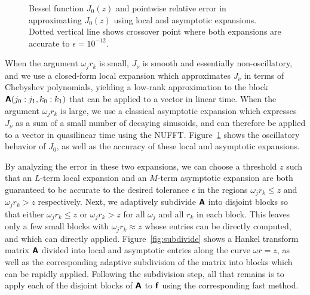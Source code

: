 \begin{figure}[!t]
\begin{subfigure}[b]{0.45\textwidth}
  \end{subfigure}
  \caption{Bessel function $J_0(z)$ and pointwise relative error in
  approximating $J_0(z)$ using local and asymptotic expansions. Dotted vertical
  line shows crossover point where both expansions are accurate to $\epsilon =
  10^{-12}$.}
  \label{fig:two-expansions}
\end{figure}

When the argument $\omega_j r_k$ is small, $J_\nu$ is smooth and essentially
non-oscillatory, and we use a closed-form local expansion which approximates
$J_\nu$ in terms of Chebyshev polynomials, yielding a low-rank approximation to
the block $\bm{\mathsf{A}}(j_0:j_1, k_0:k_1)$ that can be applied to a vector in linear
time. When the argument $\omega_j r_k$ is large, we use a classical asymptotic
expansion which expresses $J_\nu$ as a sum of a small number of decaying
sinusoids, and can therefore be applied to a vector in quasilinear time using
the NUFFT. Figure~\ref{fig:two-expansions} shows the oscillatory behavior of
$J_0$, as well as the accuracy of these local and asymptotic expansions.

By analyzing the error in these two expansions, we can choose a threshold $z$
such that an $L$-term local expansion and an $M$-term asymptotic expansion are
both guaranteed to be accurate to the desired tolerance $\epsilon$ in the
regions $\omega_j r_k \leq z$ and $\omega_j r_k > z$ respectively. Next, we
adaptively subdivide $\bm{\mathsf{A}}$ into disjoint blocks so that either $\omega_j r_k
\leq z$ or $\omega_j r_k > z$ for all $\omega_j$ and all $r_k$ in each block.
This leaves only a few small blocks with $\omega_j r_k \approx z$ whose entries
can be directly computed, and which can directly applied.
Figure~\ref{fig:subdivide} shows a Hankel transform
matrix $\bm{\mathsf{A}}$ divided into local and asymptotic entries along the curve
$\omega r = z$, as well as the corresponding adaptive subdivision of the matrix
into blocks which can be rapidly applied. Following the subdivision step, all
that remains is to apply each of the disjoint blocks of $\bm{\mathsf{A}}$ to $\bm{\mathsf{f}}$
using the corresponding fast method.

